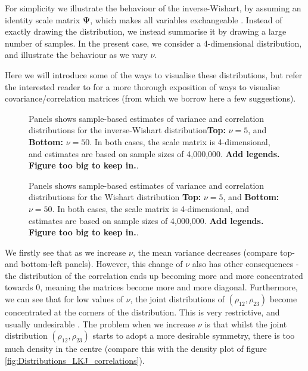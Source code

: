 \documentclass[11pt,fullpage]{book}
\begin{document}
For simplicity we illustrate the behaviour of the inverse-Wishart, by assuming an identity scale matrix $\boldsymbol{\Psi}$, which makes all variables exchangeable \cite{tokuda2011visualizing}. Instead of exactly drawing the distribution, we instead summarise it by drawing a large number of samples. In the present case, we consider a 4-dimensional distribution, and illustrate the behaviour as we vary $\nu$.

Here we will introduce some of the ways to visualise these distributions, but refer the interested reader to \cite{tokuda2011visualizing} for a more thorough exposition of ways to visualise covariance/correlation matrices (from which we borrow here a few suggestions). 

\begin{figure}
\centering
\scalebox{0.3} 
\caption{Panels shows sample-based estimates of variance and correlation distributions for the inverse-Wishart distribution\textbf{Top:} $\nu=5$, and \textbf{Bottom:} $\nu=50$. In both cases, the scale matrix is 4-dimensional, and estimates are based on sample sizes of 4,000,000. \textbf{Add legends. Figure too big to keep in.}.}\label{fig:Distributions_invWishart}
\end{figure}

\begin{figure}
\centering
\scalebox{0.3} 
\caption{Panels shows sample-based estimates of variance and correlation distributions for the Wishart distribution \textbf{Top:} $\nu=5$, and \textbf{Bottom:} $\nu=50$. In both cases, the scale matrix is 4-dimensional, and estimates are based on sample sizes of 4,000,000. \textbf{Add legends. Figure too big to keep in.}.}\label{fig:Distributions_Wishart}
\end{figure}
 
We firstly see that as we increase $\nu$, the mean variance decreases (compare top- and bottom-left panels). However, this change of $\nu$ also has other consequences - the distribution of the correlation ends up becoming more and more concentrated towards 0, meaning the matrices become more and more diagonal. Furthermore, we can see that for low values of $\nu$, the joint distributions of $(\rho_{12},\rho_{23})$ become concentrated at the corners of the distribution. This is very restrictive, and usually undesirable \cite{tokuda2011visualizing}. The problem when we increase $\nu$ is that whilst the joint distribution $(\rho_{12},\rho_{23})$ starts to adopt a more desirable symmetry, there is too much density in the centre (compare this with the density plot of figure \ref{fig:Distributions_LKJ_correlations}). 
\end{document}
